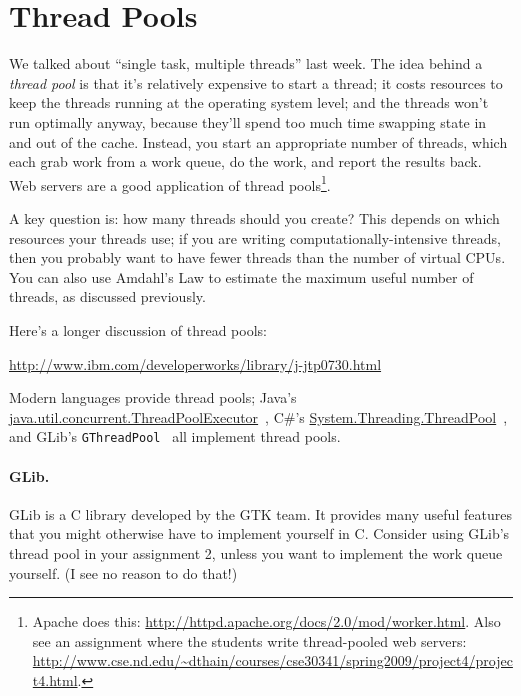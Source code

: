 \section*{Thread Pools} We talked about ``single task, multiple threads''
last week. The idea behind a \emph{thread pool} is that it's relatively
expensive to start a thread; it costs resources to keep the threads
running at the operating system level; and the threads won't run
optimally anyway, because they'll spend too much time swapping state
in and out of the cache.  Instead, you start an appropriate number of
threads, which each grab work from a work queue, do the work,
and report the results back. Web servers are a good application of
thread pools\footnote{Apache does this: \url{http://httpd.apache.org/docs/2.0/mod/worker.html}. Also see an assignment where the students write thread-pooled web servers: \url{http://www.cse.nd.edu/~dthain/courses/cse30341/spring2009/project4/project4.html}.}.

A key question is: how many threads should you create?  This depends
on which resources your threads use; if you are writing
computationally-intensive threads, then you probably want to have
fewer threads than the number of virtual CPUs. You can also use
Amdahl's Law to estimate the maximum useful number of threads, as
discussed previously.

Here's a longer discussion of thread pools:

\begin{center}
\url{http://www.ibm.com/developerworks/library/j-jtp0730.html}
\end{center}

Modern languages provide thread pools; Java's
\url{java.util.concurrent.ThreadPoolExecutor}~\cite{java:threadpoolexecutor}, C\#'s
\url{System.Threading.ThreadPool}~\cite{csharp:threadpool}, and GLib's {\tt GThreadPool}~\cite{gnome:threadpool} all implement thread pools. 

\paragraph{GLib.} 
GLib is a C library developed by the GTK team. It provides many useful
features that you might otherwise have to implement yourself in C.
Consider using GLib's thread pool in your assignment 2, unless you
want to implement the work queue yourself.  (I see no reason to do
that!)




